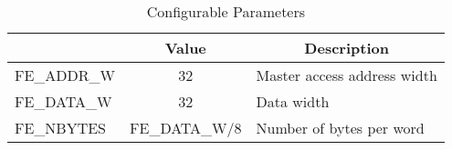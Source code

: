 \begin{table}[H]
  \centering
  \begin{tabular}{|l|c|p{10.5cm}|}

    \hline
    \rowcolor{iob-green}
    \multicolumn{1}{|c}{\bf Name} & \multicolumn{1}{|c|}{\bf Value} & \multicolumn{1}{c|}{\bf Description}  \\ \hline \hline

    FE\_ADDR\_W & 32 & Master access address width \\
    \hline
    FE\_DATA\_W & 32 & Data width \\ 
    \hline
    FE\_NBYTES & FE\_DATA\_W/8 & Number of bytes per word \\
    \hline

  \end{tabular}
  \caption{Configurable Parameters}
\end{table}
